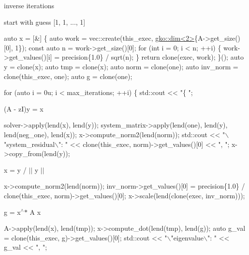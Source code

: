 inverse iterations

start with guess \mbox{[}1, 1, ..., 1\mbox{]}


\begin{DoxyCode}
\textcolor{keyword}{auto} x = [&] \{
    \textcolor{keyword}{auto} work = vec::create(this\_exec, \hyperlink{structgko_1_1dim}{gko::dim<2>}\{A->get\_size()[0], 1\});
    \textcolor{keyword}{const} \textcolor{keyword}{auto} n = work->get\_size()[0];
    \textcolor{keywordflow}{for} (\textcolor{keywordtype}{int} i = 0; i < n; ++i) \{
        work->get\_values()[i] = precision\{1.0\} / sqrt(n);
    \}
    \textcolor{keywordflow}{return} clone(exec, work);
\}();
\textcolor{keyword}{auto} y = clone(x);
\textcolor{keyword}{auto} tmp = clone(x);
\textcolor{keyword}{auto} norm = clone(one);
\textcolor{keyword}{auto} inv\_norm = clone(this\_exec, one);
\textcolor{keyword}{auto} g = clone(one);

\textcolor{keywordflow}{for} (\textcolor{keyword}{auto} i = 0u; i < max\_iterations; ++i) \{
    std::cout << \textcolor{stringliteral}{"\{ "};
\end{DoxyCode}


(A -\/ zI)y = x


\begin{DoxyCode}
solver->apply(lend(x), lend(y));
system\_matrix->apply(lend(one), lend(y), lend(neg\_one), lend(x));
x->compute\_norm2(lend(norm));
std::cout << \textcolor{stringliteral}{"\(\backslash\)"system\_residual\(\backslash\)": "}
          << clone(this\_exec, norm)->get\_values()[0] << \textcolor{stringliteral}{", "};
x->copy\_from(lend(y));
\end{DoxyCode}


x = y / $\vert$$\vert$ y $\vert$$\vert$


\begin{DoxyCode}
x->compute\_norm2(lend(norm));
inv\_norm->get\_values()[0] =
    precision\{1.0\} / clone(this\_exec, norm)->get\_values()[0];
x->scale(lend(clone(exec, inv\_norm)));
\end{DoxyCode}


g = x$^\wedge$$\ast$ A x


\begin{DoxyCode}
A->apply(lend(x), lend(tmp));
x->compute\_dot(lend(tmp), lend(g));
\textcolor{keyword}{auto} g\_val = clone(this\_exec, g)->get\_values()[0];
std::cout << \textcolor{stringliteral}{"\(\backslash\)"eigenvalue\(\backslash\)": "} << g\_val << \textcolor{stringliteral}{", "};
\end{DoxyCode}


